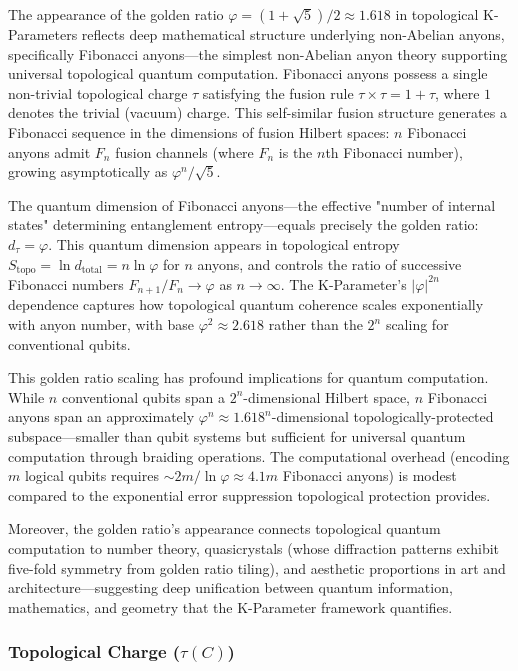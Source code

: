 \documentclass[11pt,a4paper,twoside]{article}
\begin{document}
The appearance of the golden ratio $\varphi = (1+\sqrt{5})/2 \approx 1.618$ in topological K-Parameters reflects deep mathematical structure underlying non-Abelian anyons, specifically Fibonacci anyons---the simplest non-Abelian anyon theory supporting universal topological quantum computation. Fibonacci anyons possess a single non-trivial topological charge $\tau$ satisfying the fusion rule $\tau \times \tau = 1 + \tau$, where $1$ denotes the trivial (vacuum) charge. This self-similar fusion structure generates a Fibonacci sequence in the dimensions of fusion Hilbert spaces: $n$ Fibonacci anyons admit $F_n$ fusion channels (where $F_n$ is the $n$th Fibonacci number), growing asymptotically as $\varphi^n/\sqrt{5}$.

The quantum dimension of Fibonacci anyons---the effective "number of internal states" determining entanglement entropy---equals precisely the golden ratio: $d_{\tau} = \varphi$. This quantum dimension appears in topological entropy $S_{\text{topo}} = \ln d_{\text{total}} = n \ln \varphi$ for $n$ anyons, and controls the ratio of successive Fibonacci numbers $F_{n+1}/F_n \to \varphi$ as $n \to \infty$. The K-Parameter's $|\varphi|^{2n}$ dependence captures how topological quantum coherence scales exponentially with anyon number, with base $\varphi^2 \approx 2.618$ rather than the $2^n$ scaling for conventional qubits.

This golden ratio scaling has profound implications for quantum computation. While $n$ conventional qubits span a $2^n$-dimensional Hilbert space, $n$ Fibonacci anyons span an approximately $\varphi^n \approx 1.618^n$-dimensional topologically-protected subspace---smaller than qubit systems but sufficient for universal quantum computation through braiding operations. The computational overhead (encoding $m$ logical qubits requires $\sim 2m/\ln\varphi \approx 4.1m$ Fibonacci anyons) is modest compared to the exponential error suppression topological protection provides.

Moreover, the golden ratio's appearance connects topological quantum computation to number theory, quasicrystals (whose diffraction patterns exhibit five-fold symmetry from golden ratio tiling), and aesthetic proportions in art and architecture---suggesting deep unification between quantum information, mathematics, and geometry that the K-Parameter framework quantifies.

\subsubsection{Topological Charge ($\tau(C)$)}
\end{document}
